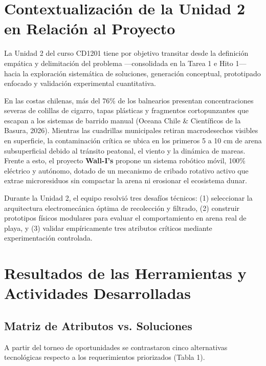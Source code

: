\documentclass[12pt,letterpaper]{article}
\begin{document}
\clearpage
{}
\setcounter{page}{2}

\section{Contextualización de la Unidad 2 en Relación al Proyecto}

La Unidad 2 del curso CD1201 tiene por objetivo transitar desde la definición empática y delimitación del problema —consolidada en la Tarea 1 e Hito 1— hacia la exploración sistemática de soluciones, generación conceptual, prototipado enfocado y validación experimental cuantitativa.

En las costas chilenas, más del 76\% de los balnearios presentan concentraciones severas de colillas de cigarro, tapas plásticas y fragmentos cortopunzantes que escapan a los sistemas de barrido manual (Oceana Chile \& Científicos de la Basura, 2026). Mientras las cuadrillas municipales retiran macrodesechos visibles en superficie, la contaminación crítica se ubica en los primeros 5 a 10 cm de arena subsuperficial debido al tránsito peatonal, el viento y la dinámica de mareas. Frente a esto, el proyecto \textbf{Wall-I's} propone un sistema robótico móvil, 100\% eléctrico y autónomo, dotado de un mecanismo de cribado rotativo activo que extrae microresiduos sin compactar la arena ni erosionar el ecosistema dunar.

Durante la Unidad 2, el equipo resolvió tres desafíos técnicos: (1) seleccionar la arquitectura electromecánica óptima de recolección y filtrado, (2) construir prototipos físicos modulares para evaluar el comportamiento en arena real de playa, y (3) validar empíricamente tres atributos críticos mediante experimentación controlada.

\section{Resultados de las Herramientas y Actividades Desarrolladas}

\subsection{Matriz de Atributos vs. Soluciones}
A partir del torneo de oportunidades se contrastaron cinco alternativas tecnológicas respecto a los requerimientos priorizados (Tabla 1).
\end{document}
